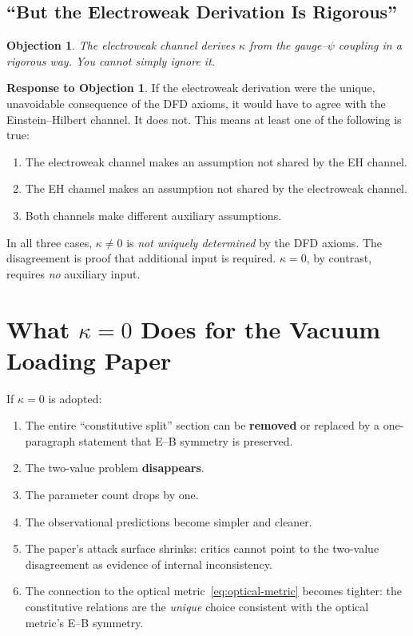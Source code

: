 \documentclass[12pt,a4paper]{article}
\newtheorem{objection}{Objection}
\theoremstyle{definition}
\newtheorem{response}{Response to Objection}
\theoremstyle{remark}
\begin{document}
\subsection{``But the Electroweak Derivation Is Rigorous''}

\begin{objection}
The electroweak channel derives $\kappa$ from the gauge--$\psi$ coupling
in a rigorous way.  You cannot simply ignore it.
\end{objection}

\begin{response}
If the electroweak derivation were the unique, unavoidable consequence
of the DFD axioms, it would have to agree with the Einstein--Hilbert
channel.  It does not.  This means at least one of the following is true:
\begin{enumerate}
\item The electroweak channel makes an assumption not shared by the
  EH channel.
\item The EH channel makes an assumption not shared by the electroweak
  channel.
\item Both channels make different auxiliary assumptions.
\end{enumerate}
In all three cases, $\kappa \neq 0$ is \emph{not uniquely determined}
by the DFD axioms.  The disagreement is proof that additional input is
required.  $\kappa = 0$, by contrast, requires \emph{no} auxiliary input.
\end{response}

\section{What $\kappa = 0$ Does for the Vacuum Loading Paper}
\label{sec:simplification}

If $\kappa = 0$ is adopted:
\begin{enumerate}
\item The entire ``constitutive split'' section can be \textbf{removed}
  or replaced by a one-paragraph statement that E--B symmetry is
  preserved.
\item The two-value problem \textbf{disappears}.
\item The parameter count drops by one.
\item The observational predictions become simpler and cleaner.
\item The paper's attack surface shrinks: critics cannot point to the
  two-value disagreement as evidence of internal inconsistency.
\item The connection to the optical metric~\eqref{eq:optical-metric}
  becomes tighter: the constitutive relations are the \emph{unique}
  choice consistent with the optical metric's E--B symmetry.
\end{enumerate}
\end{document}

